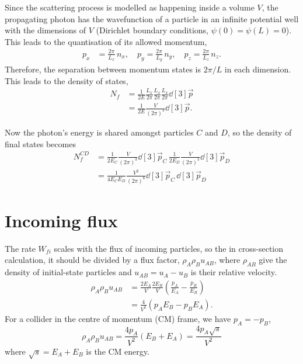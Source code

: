 Since the scattering process is modelled as happening inside a volume $V$, the propagating photon has the wavefunction of a particle in an infinite potential well with the dimensions of $V$ (Dirichlet boundary conditions, $\psi(0) = \psi(L) = 0$). This leads to the quantisation of its allowed momentum,
\begin{align}
p_x &= \frac{2\pi}{L_x}\, n_x, \quad
p_y = \frac{2\pi}{L_y}\, n_y, \quad
p_z = \frac{2\pi}{L_z}\, n_z.
\end{align}
Therefore, the separation between momentum states is $2\pi/L$ in each dimension. This leads to the density of states,
\begin{align}
N_f &= \frac{1}{2E} \frac{L_x}{2\pi} \frac{L_x}{2\pi} \frac{L_x}{2\pi} \dd[3]{\vec{p}} \nonumber \\
&= \frac{1}{2E} \frac{V}{(2\pi)^3} \dd[3]{\vec{p}}.
\end{align}

Now the photon's energy is shared amongst particles $C$ and $D$, so the density of final states becomes
\begin{align}
N_f^{CD} &= \frac{1}{2E_C} \frac{V}{(2\pi)^3} \dd[3]{\vec{p}_C} \, \frac{1}{2E_D} \frac{V}{(2\pi)^3} \dd[3]{\vec{p}_D} \\
&= \frac{1}{4E_CE_D}\frac{V^2}{(2\pi)^6} \dd[3]{\vec{p}_C} \, \dd[3]{\vec{p}_D}
\end{align}

\section{Incoming flux}
The rate $W_{fi}$ scales with the flux of incoming particles, so the in cross-section calculation, it should be divided by a flux factor, $\rho_A\rho_Bu_{AB}$, where $\rho_{AB}$ give the density of initial-state particles and $u_{AB} = u_A - u_B$ is their relative velocity.
\begin{align}
\rho_A\rho_Bu_{AB} &= \frac{2E_A}{V} \frac{2E_B}{V} \left( \frac{p_A}{E_A} - \frac{p_B}{E_B} \right) \\
&= \frac{4}{V^2} \left( p_A E_B - p_B E_A \right).
\end{align}
For a collider in the centre of momentum (CM) frame, we have $p_A = -p_B$,
\begin{equation}
\rho_A\rho_Bu_{AB} = \frac{4p_A}{V^2} (E_B + E_A) = \frac{4p_A\sqrt{s}}{V^2}
\end{equation}
where $\sqrt{s} = E_A + E_B$ is the CM energy.

